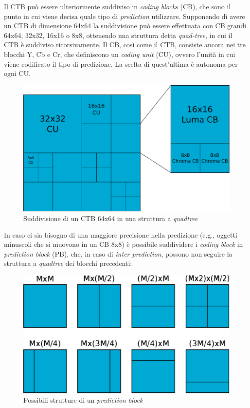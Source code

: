Il CTB può essere ulteriormente suddiviso in \emph{coding blocks} (CB), che 
sono il punto in cui viene decisa quale tipo di \emph{prediction} utilizzare.
Supponendo di avere un CTB di dimensione 64x64 la suddivisione può essere 
effettuata con CB grandi 64x64, 32x32, 16x16 o 8x8, ottenendo una struttura
detta \emph{quad-tree}, in cui il CTB è suddiviso ricorsivamente. 
Il CB, così come il CTB, consiste ancora nei tre blocchi Y, Cb e 
Cr, che definiscono un \emph{coding unit} (CU), ovvero l'unità in cui viene 
codificato il tipo di predizione. La scelta di quest'ultima è autonoma per ogni 
CU.
\begin{figure}[H]
  \centering
  \includegraphics[scale=0.50]{Figures/CTB-CU-CB}
  \caption[Suddivisione del CTB in CU]{Suddivisione di un CTB 64x64 in una 
struttura a \emph{quadtree}}
\end{figure}
In caso ci sia bisogno di una maggiore precisione nella predizione (e.g., 
oggetti minuscoli che si muovono in un CB 8x8) è possibile suddividere i
\emph{coding block} in \emph{prediction block} (PB), che, in caso di 
\emph{inter prediction}, possono non seguire la struttura a \emph{quadtree} dei
blocchi precedenti:
\begin{figure}[H]
  \centering
  \includegraphics[scale=0.50]{Figures/PB}
  \caption{Possibili strutture di un \emph{prediction block}}
\end{figure}
